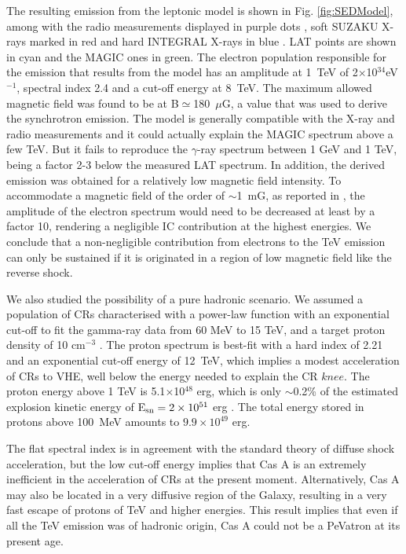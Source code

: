 \documentclass{PoS}
\begin{document}
The resulting emission from the leptonic model is shown in Fig. \ref{fig:SEDModel}, among with the radio measurements displayed in purple dots \cite{Lastochkin_1963,Medd_1965,Allen_1967,Parker_1968,Braude_1969,Hales_1995,Planck_2014}, soft SUZAKU X-rays marked in red \cite{suzaku_2009} and hard INTEGRAL X-rays in blue \cite{integral_2016}. LAT points are shown in cyan and the MAGIC ones in green. The electron population responsible for the emission that results from the model has an amplitude at 1~TeV of 2$\times$10$^{34}$eV$^{-1}$, spectral index 2.4 and a cut-off energy at 8~TeV. The maximum allowed magnetic field was found to be at B$\simeq$180~$\mu$G, a value that was used to derive the synchrotron emission. The model is generally compatible with the X-ray and radio measurements and it could actually explain the MAGIC spectrum above a few TeV. But it fails to reproduce the $\gamma$-ray spectrum between 1 GeV and 1 TeV, being a factor 2-3 below the measured LAT spectrum. In addition, the derived emission was obtained for a relatively low magnetic field intensity. To accommodate a magnetic field of the order of $\sim$1~mG, as reported in \cite{Uchiyama_2008}, the amplitude of the electron spectrum would need to be decreased at least by a factor 10, rendering a negligible IC contribution at the highest energies. We conclude that a non-negligible contribution from electrons to the TeV emission can only be sustained if it is originated in a region of low magnetic field like the reverse shock.

We also studied the possibility of a pure hadronic scenario. We assumed a population of CRs characterised with a power-law function with an exponential cut-off to fit the gamma-ray data from 60 MeV to 15 TeV, and a target proton density of 10 cm$^{-3}$ \cite{Laming_2003}. The proton spectrum is best-fit with a hard index of 2.21 and an exponential cut-off energy of 12~TeV, which implies a modest acceleration of CRs to VHE, well below the energy needed to explain the CR $knee$. The proton energy above 1 TeV is 5.1$\times$10$^{48}$ erg, which is only $\sim$0.2\% of the estimated explosion kinetic energy of ${\rm E_{\rm sn}} = 2\times10^{51}$ erg \cite{Laming_2003}. The total energy stored in protons above 100~MeV amounts to $9.9\times10^{49}$ erg.

The flat spectral index is in agreement with the standard theory of diffuse shock acceleration, but the low cut-off energy implies that Cas A is an extremely inefficient in the acceleration of CRs at the present moment. Alternatively, Cas A may also be located in a very diffusive region of the Galaxy, resulting in a very fast escape of protons of TeV and higher energies.
This result implies that even if all the TeV emission was of hadronic origin, Cas A could not be a PeVatron at its present age.
\end{document}
